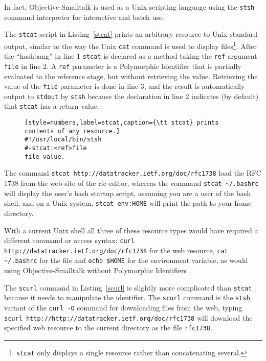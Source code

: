 \documentclass[preprint,authoryear]{llncs}
\begin{document}
In fact,  Objective-Smalltalk is used as a Unix scripting language using the {\tt stsh} command
interpreter for interactive and batch use.  

The {\tt stcat} script in Listing~\ref{stcat} prints an arbitrary resource to Unix standard output, 
similar to the way the Unix {\tt cat} command is used to display files\footnote{{\tt stcat} only 
displays a single resource rather than concatenating several.}.
After the ``hashbang'' in line 1 {\tt stcat} is declared as a method taking the {\tt ref} argument {\tt file} 
in line 2.
A {\tt ref} parameter is a Polymorphic Identifier that is partially evaluated to the reference stage,
but without retrieving the value.  Retrieving the value of the {\tt file} parameter is done in line 3,
and the result is automatically output to {\tt stdout} by {\tt stsh} because the declaration in line
2 indicates (by default) that {\tt stcat} has a return value.

\begin{figure}[htbp]
\begin{lstlisting}[style=numbers,label=stcat,caption={\tt stcat} prints contents of any resource.]
#!/usr/local/bin/stsh
#-stcat:<ref>file
file value.
\end{lstlisting}
\end{figure}

The command  {\tt stcat http://datatracker.ietf.org/doc/rfc1738} load the RFC 1738 from the web site of the rfc-editor, whereas 
the command {\tt stcat \~\//.bashrc} will display the user's bash startup script, assuming you are a user of the
bash shell, and on a Unix system, {\tt stcat env:HOME} will print the path to 
your home directory.

With a current Unix shell all three of these resource types would have required a different
command or access syntax:   {\tt curl http://datatracker.ietf.org/doc/rfc1738} for the
web resource, {\tt cat  \~\//.bashrc} for the file and {\tt echo \$HOME} for the environment
variable, as would using Objective-Smalltalk without Polymorphic Identifiers .

The {\tt scurl} command in Listing~\ref{scurl} is slightly more complicated than {\tt stcat} because
it needs to manipulate the identifier.  The {\tt scurl} command
is the {\tt stsh} variant of the {\tt curl -O} command for downloading files from the web, typing
{\tt scurl http://http://datatracker.ietf.org/doc/rfc1738} will download the specified web resource
to the current directory as the file {\tt rfc1738}.
\end{document}
